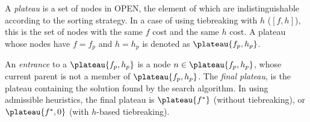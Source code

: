 A \emph{plateau} is a set of nodes in OPEN, the element of which are
indistinguishable according to the sorting strategy. In a case of \astar
using tiebreaking with $h$ ($[f,h]$), this is the set of nodes with the
same $f$ cost and the same $h$ cost.
A plateau whose nodes have $f=f_p$ and $h=h_p$ is denoted as $\plateau{f_p,h_p}$.

An \emph{entrance} to a $\plateau{f_p,h_p}$ is a node $n \in
\plateau{f_p,h_p}$, whose current parent is not a member of
$\plateau{f_p,h_p}$.  The \emph{final plateau}, is the plateau
containing the solution found by the search algorithm.  In \astar using
admissible heuristics, the final plateau is $\plateau{f^*}$ (without
tiebreaking), or $\plateau{f^*,0}$ (with $h$-based tiebreaking).
